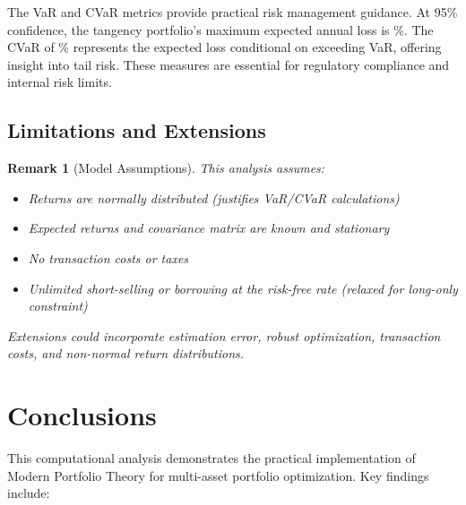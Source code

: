 \documentclass[a4paper, 11pt]{article}
\newtheorem{remark}{Remark}[section]
\begin{document}
The VaR and CVaR metrics provide practical risk management guidance. At 95\% confidence, the
tangency portfolio's maximum expected annual loss is \%. The CVaR
of \% represents the expected loss conditional on exceeding VaR,
offering insight into tail risk. These measures are essential for regulatory compliance and
internal risk limits.

\subsection{Limitations and Extensions}

\begin{remark}[Model Assumptions]
This analysis assumes:
\begin{itemize}
\item Returns are normally distributed (justifies VaR/CVaR calculations)
\item Expected returns and covariance matrix are known and stationary
\item No transaction costs or taxes
\item Unlimited short-selling or borrowing at the risk-free rate (relaxed for long-only constraint)
\end{itemize}
Extensions could incorporate estimation error, robust optimization, transaction costs, and
non-normal return distributions.
\end{remark}

\section{Conclusions}

This computational analysis demonstrates the practical implementation of Modern Portfolio Theory
for multi-asset portfolio optimization. Key findings include:
\end{document}

